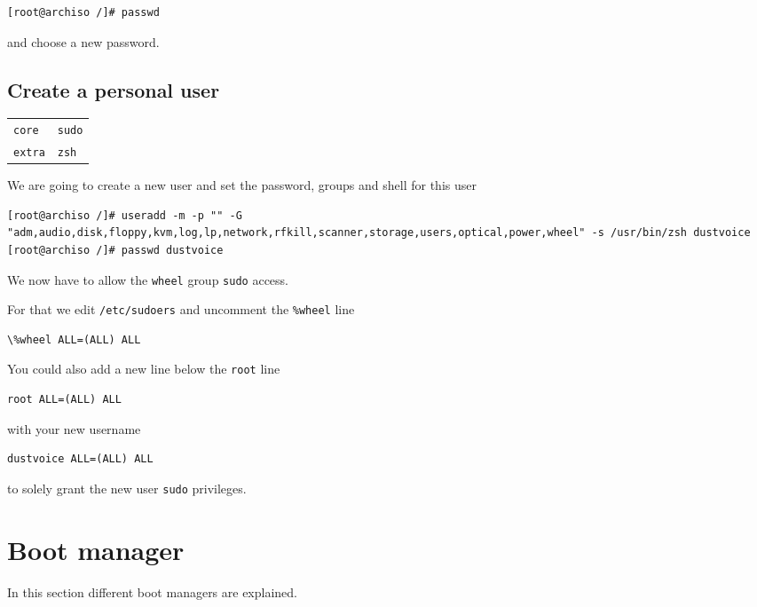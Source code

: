 \documentclass[9pt]{report}
\newenvironment{packagetable}
{\begin{longtabu}to \textwidth [b]{X[1,r]|X[1,l]}}
{\end{longtabu}}
\begin{document}
\begin{verbatim}
[root@archiso /]# passwd
\end{verbatim}

and choose a new password.



\newpage

\hypertarget{x-create-a-personal-user}{\subsection{Create a personal user}}
\begin{packagetable}
    \texttt{core} & \texttt{sudo} \\ 
    \texttt{extra} & \texttt{zsh} \\ 
\end{packagetable}

We are going to create a new user and set the password, groups and shell for this user


\begin{verbatim}
[root@archiso /]# useradd -m -p "" -G "adm,audio,disk,floppy,kvm,log,lp,network,rfkill,scanner,storage,users,optical,power,wheel" -s /usr/bin/zsh dustvoice
[root@archiso /]# passwd dustvoice
\end{verbatim}

We now have to allow the \texttt{wheel} group \texttt{sudo} access.


For that we edit \texttt{/etc/sudoers} and uncomment the \texttt{\%wheel} line


\begin{verbatim}
\%wheel ALL=(ALL) ALL
\end{verbatim}

You could also add a new line below the \texttt{root} line


\begin{verbatim}
root ALL=(ALL) ALL
\end{verbatim}

with your new username


\begin{verbatim}
dustvoice ALL=(ALL) ALL
\end{verbatim}

to solely grant the new user \texttt{sudo} privileges.


\hypertarget{x-boot-manager}{\section{Boot manager}}
In this section different boot managers are explained.
\end{document}

